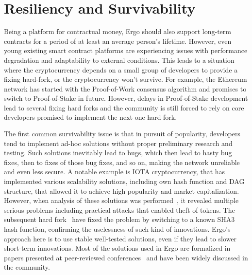 \section{Resiliency and Survivability}
\label{sec:survivability}

Being a platform for contractual money, Ergo should also support long-term contracts for a period of at least an average person's lifetime.
However, even young existing smart contract platforms are experiencing issues with performance degradation and adaptability to external conditions.
This leads to a situation where the cryptocurrency depends on a small group of developers to provide a fixing hard-fork, or the cryptocurrency won't survive.
For example, the Ethereum network has started with the Proof-of-Work consensus algorithm and promises to switch to Proof-of-Stake in future.
However, delays in Proof-of-Stake development lead to several fixing hard forks\cite{ethDifficultyBomb} and the community is
still forced to rely on core developers promised to implement the next one hard fork.


The first common survivability issue is that in pursuit of popularity, developers tend to implement ad-hoc solutions without proper preliminary research and testing.
Such solutions inevitably lead to bugs, which then lead to hasty bug fixes, then to fixes of those bug fixes, and so on, making the network unreliable and even less secure.
A notable example is IOTA cryptocurrency, that has implemented various scalability solutions, including own hash function and DAG structure,  that allowed it to achieve high popularity and market capitalization.
However, when analysis of these solutions was performed~\cite{heilmancryptanalysis, de2018break}, it revealed multiple serious problems including practical attacks that enabled theft of tokens.
The subsequent hard fork~\cite{IOTAReport} have fixed the problem by switching to a known SHA3 hash function, confirming the uselessness of such kind of innovations.
Ergo's approach here is to use stable well-tested solutions, even if they lead to slower short-term innovations.
Most of the solutions used in Ergo are formalized in papers presented at peer-reviewed
conferences~\cite{reyzin2017improving,meshkov2017short,chepurnoy2018systematic,chepurnoy2018self,chepurnoy2018checking,duong2018multi}
and have been widely discussed in the community.


